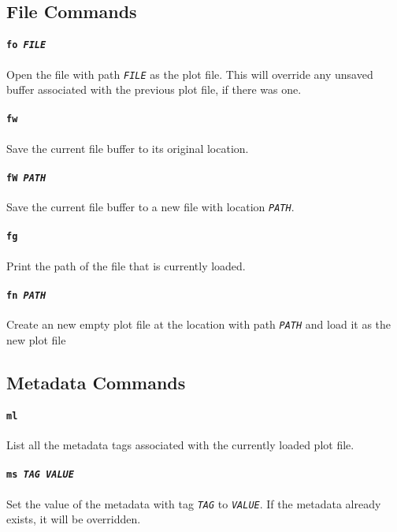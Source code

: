 \documentclass[a4paper]{article}
\begin{document}
\subsection{File Commands}

\paragraph{\texttt{fo \textit{FILE}}}
Open the file with path \texttt{\textit{FILE}} as the plot file. This will 
override any unsaved buffer associated with the previous plot file, if 
there was one.

\paragraph{\texttt{fw}}
Save the current file buffer to its original location.

\paragraph{\texttt{fW \textit{PATH}}}
Save the current file buffer to a new file with location 
\texttt{\textit{PATH}}.

\paragraph{\texttt{fg}}
Print the path of the file that is currently loaded.

\paragraph{\texttt{fn \textit{PATH}}}
Create an new empty plot file at the location with path \texttt{\textit{PATH}} 
and load it as the new plot file

\subsection{Metadata Commands}

\paragraph{\texttt{ml}}
List all the metadata tags associated with the currently loaded plot file.

\paragraph{\texttt{ms \textit{TAG VALUE}}}
Set the value of the metadata with tag \texttt{\textit{TAG}} to 
\texttt{\textit{VALUE}}. If the metadata already exists, it will be 
overridden.
\end{document}
